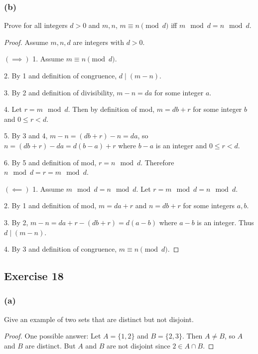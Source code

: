 \documentclass[14pt]{extarticle}
\begin{document}
\subsubsection{(b)}
Prove for all integers $d>0$ and $m,n$, \(m \equiv n \pmod d\) iff \(m \mod d = n \mod d\).

\begin{proof}
        Assume $m,n,d$ are integers with $d > 0$.

        \(\bm{(\implies)}\)
        1. Assume \(m \equiv n \pmod d\).

        2. By 1 and definition of congruence, \(d \mid (m-n)\).

        3. By 2 and definition of divisibility, \(m-n = da\) for some integer $a$.

        4. Let \(r = m \mod d\). Then by definition of mod, \(m = db + r\) for some integer $b$ and \(0 \leq r < d\).

        5. By 3 and 4, \(m-n = (db+r) - n = da\), so \(n = (db+r) - da = d(b-a)+r\) where $b-a$ is an integer and \(0 \leq r < d\).

        6. By 5 and definition of mod, \(r = n \mod d\). Therefore \(n \mod d = r = m \mod d\).

        \(\bm{(\impliedby)}\)
        1. Assume \(m \mod d = n \mod d\). Let \(r = m \mod d = n \mod d\).

        2. By 1 and definition of mod, \(m = da+r\) and \(n = db+r\) for some integers $a,b$.

        3. By 2, \(m-n = da+r - (db+r) = d(a-b)\) where $a-b$ is an integer. Thus \(d \mid (m-n)\).

        4. By 3 and definition of congruence, \(m \equiv n \pmod d\).
\end{proof}

\subsection{Exercise 18}

\subsubsection{(a)}
Give an example of two sets that are distinct but not disjoint.

\begin{proof}
        One possible answer: Let \(A = \{1, 2\}\) and \(B = \{2, 3\}\). Then \(A \neq B\), so \(A\) and \(B\) are distinct.
        But \(A\) and \(B\) are not disjoint since \(2 \in A \cap B\).
\end{proof}
\end{document}
